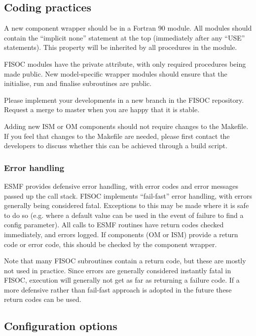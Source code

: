 \documentclass[11pt]{article}
\begin{document}
\subsection{Coding practices}

A new component wrapper  should be in a Fortran 90 module.  
All modules should contain the ``implicit none'' statement at the top (immediately after any 
``USE'' statements).  This property will be inherited by all procedures in the module.

FISOC modules have the private attribute, with only required procedures being 
made public. 
New model-specific wrapper modules should ensure that the initialise, run and finalise 
subroutines are public. 

Please implement your developments in a new branch in the FISOC repository. 
Request a merge to master when you are happy that it is stable. 

Adding new ISM or OM components should not require changes to the Makefile.
If you feel that changes to the Makefile are needed, please first contact the developers
to discuss whether this can be achieved through a 
build script.


\subsubsection{Error handling}

ESMF provides defensive error handling, with error codes and error messages passed up the 
call stack. 
FISOC implements ``fail-fast'' error handling, with errors generally being considered 
fatal. 
Exceptions to this may be made where it is safe to do so (e.g. where a default value can be 
used in the event of  failure to find a config parameter).
All calls to ESMF routines have return codes checked immediately, and errors logged.
If components (OM or ISM) provide a return code or error code, 
this should be checked by the component wrapper.

Note that many FISOC subroutines contain a return code, but these are mostly not used in 
practice.  Since errors are generally considered instantly fatal in FISOC, execution will 
generally not get as far as returning a failure code. 
If a more defensive rather than fail-fast approach is adopted in the future these return 
codes can be used.



\subsection{Configuration options}
\end{document}
